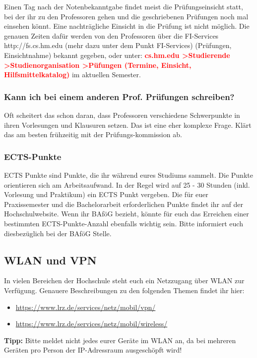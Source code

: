 Einen Tag nach der Notenbekanntgabe findet meist die Prüfungseinsicht statt, bei der ihr zu den Professoren gehen und die geschriebenen Prüfungen noch mal einsehen könnt. Eine nachträgliche Einsicht in die Prüfung ist nicht möglich. Die genauen Zeiten dafür werden von den Professoren über die FI-Services http://fs.cs.hm.edu (mehr dazu unter dem Punkt FI-Services) (Prüfungen, Einsichtnahme) bekannt gegeben, oder unter:\doublebreak
\textcolor{red}{\textbf{cs.hm.edu \textgreater Studierende \textgreater Studienorganisation \textgreater Püfungen (Termine, Einsicht, Hilfsmittelkatalog)}} im aktuellen Semester.

\subsubsection{Kann ich bei einem anderen Prof. Prüfungen schreiben?}

Oft scheitert das schon daran, dass Professoren verschiedene Schwerpunkte in ihren Vorlesungen und Klausuren setzen. Das ist eine eher komplexe Frage. Klärt das am besten frühzeitig mit der Prüfungs-kommission ab.

\subsubsection{ECTS-Punkte}

ECTS Punkte sind Punkte, die ihr während eures Studiums sammelt. Die Punkte orientieren sich am Arbeitsaufwand. In der Regel wird auf 25 - 30 Stunden (inkl. Vorlesung und Praktikum) ein ECTS Punkt vergeben. Die für euer Praxissemester und die Bachelorarbeit erforderlichen Punkte findet ihr auf der Hochschulwebsite.\doublebreak
Wenn ihr BAföG bezieht, könnte für euch das Erreichen einer bestimmten ECTS-Punkte-Anzahl ebenfalls wichtig sein. Bitte informiert euch diesbezüglich bei der BAföG Stelle.

\subsection{WLAN und VPN}

In vielen Bereichen der Hochschule steht euch ein Netzzugang über WLAN zur Verfügung. Genauere Beschreibungen zu den folgenden Themen findet ihr hier:

\begin{itemize}
	\item{\url{https://www.lrz.de/services/netz/mobil/vpn/}}
	\item{\url{https://www.lrz.de/services/netz/mobil/wireless/}}
\end{itemize}
\textbf{Tipp:} Bitte meldet nicht jedes eurer Geräte im WLAN an, da bei mehreren Geräten pro Person der IP-Adressraum ausgeschöpft wird!

